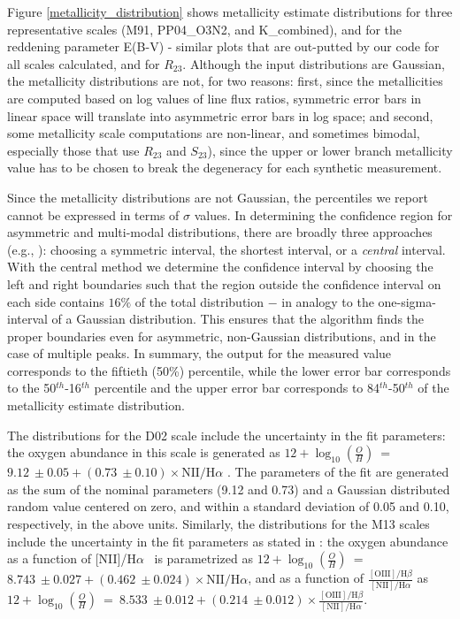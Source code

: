\documentclass{emulateapj}
\newcommand{\oxab}{\ensuremath{12 + \log_{10}(\frac{O}{H})}}
\newcommand{\ha}{H$\alpha$}
\begin{document}
Figure \ref{metallicity_distribution} shows metallicity estimate distributions for three representative scales (M91, PP04\_O3N2, and K\_combined), and for the reddening parameter E(B-V) - similar plots that are out-putted by our code for all scales calculated, and for $R_{23}$. Although the input distributions are Gaussian, the metallicity distributions are not, for two reasons: first, since the metallicities are computed based on log values of line flux ratios, symmetric error bars in linear space will translate into asymmetric error bars in log space; and second, some metallicity scale computations are non-linear, and sometimes bimodal, especially those that use $R_{23}$ and $S_{23}$), since the upper or lower branch metallicity value has to be chosen to break the degeneracy for each synthetic measurement.

Since the metallicity distributions are not Gaussian, the percentiles we report cannot be expressed in terms of $\sigma$ values. In determining the confidence region for asymmetric and multi-modal distributions, there are broadly three approaches (e.g., \citealt{andrae10}): choosing a symmetric interval, the shortest interval, or a \emph{central} interval.  With the central method we determine the confidence interval by choosing the left and right boundaries such that the region outside the confidence interval on each side contains $16\%$ of the total distribution $-$ in analogy to the one-sigma-interval of a Gaussian distribution. This ensures that the algorithm finds the proper boundaries even for asymmetric, non-Gaussian distributions, and in the case of multiple peaks. In summary, the output for the measured value corresponds to the fiftieth (50\%) percentile, while the lower error bar corresponds to the 50$^{th}$-16$^{th}$ percentile and the upper error bar corresponds to 84$^{th}$-50$^{th}$ of the metallicity estimate distribution. 

The distributions for the D02 scale include the uncertainty in the fit parameters: the oxygen abundance in this scale is generated as \oxab~=~$9.12~\pm 0.05 + (0.73~\pm 0.10)\times\mathrm{NII}/\mathrm{H}\alpha$ \citep{denicolo02}. The parameters of the fit are generated as the sum of the nominal parameters (9.12 and 0.73) and a Gaussian distributed random value centered on zero, and within a standard deviation of 0.05 and 0.10, respectively, in the above units.
Similarly, the distributions for the M13 scales include the uncertainty in the fit parameters as stated in \citet{marino13}: the oxygen abundance as a function of [NII]/\ha~ is parametrized as \oxab~=~$8.743~\pm 0.027 + (0.462~\pm 0.024)\times\mathrm{NII}/\mathrm{H}\alpha$, and as a function of $\frac{\mathrm{[OIII]/H}\beta} {\mathrm{[NII]/H}\alpha}$ as \oxab~=~$8.533~\pm 0.012 + (0.214~\pm 0.012)\times\frac{\mathrm{[OIII]/H}\beta} {\mathrm{[NII]/H}\alpha}$.
\end{document}
